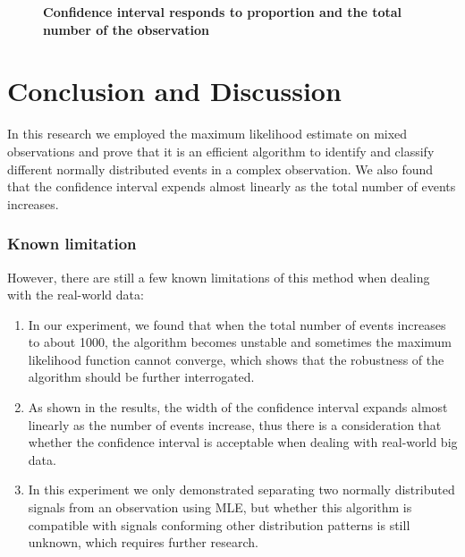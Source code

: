 \documentclass[10pt,a4paper,twocolumn,twoside,UTF8]{article}
\begin{document}
	\begin{figure}[htbp]
		\centering
		\caption{\textbf{Confidence interval responds to proportion and the total number of the observation}}
	\end{figure}


\section{Conclusion and Discussion}
	In this research we employed the maximum likelihood estimate on mixed observations and prove that it is an efficient algorithm to identify and classify different normally distributed events in a complex observation.
	We also found that the confidence interval expends almost linearly as the total number of events increases. 

		\subsubsection{Known limitation}
		However, there are still a few known limitations of this method when dealing with the real-world data:
		\begin{enumerate}[label=\arabic*.]
			\item In our experiment, we found that when the total number of events increases to about 1000, the algorithm becomes unstable and sometimes the maximum likelihood function cannot converge, which shows that the robustness of the algorithm should be further interrogated.
			\item As shown in the results, the width of the confidence interval expands almost linearly as the number of events increase, thus there is a consideration that whether the confidence interval is acceptable when dealing with real-world big data.
			\item In this experiment we only demonstrated separating two normally distributed signals from an observation using MLE, but whether this algorithm is compatible with signals conforming other distribution patterns is still unknown, which requires further research.
		\end{enumerate}



\printbibliography[title=Reference] 
\end{document}

